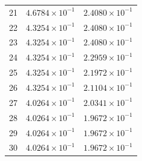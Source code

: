 \begin{table}[H]
\begin{tabular}{@{}rrr@{}}
21 & $4.6784\times10^{-1}$ & $2.4080\times10^{-1}$\\
22 & $4.3254\times10^{-1}$ & $2.4080\times10^{-1}$\\
23 & $4.3254\times10^{-1}$ & $2.4080\times10^{-1}$\\
24 & $4.3254\times10^{-1}$ & $2.2959\times10^{-1}$\\
25 & $4.3254\times10^{-1}$ & $2.1972\times10^{-1}$\\
26 & $4.3254\times10^{-1}$ & $2.1104\times10^{-1}$\\
27 & $4.0264\times10^{-1}$ & $2.0341\times10^{-1}$\\
28 & $4.0264\times10^{-1}$ & $1.9672\times10^{-1}$\\
29 & $4.0264\times10^{-1}$ & $1.9672\times10^{-1}$\\
30 & $4.0264\times10^{-1}$ & $1.9672\times10^{-1}$\\
\bottomrule
\end{tabular}
\end{table}


